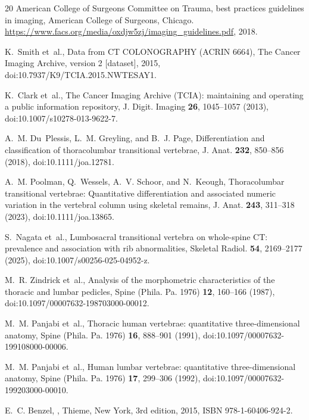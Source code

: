 \documentclass[aapm,mph,amsmath,amssymb,reprint]{revtex4-2}
\begin{document}
\begin{thebibliography}{20}
{American College of Surgeons Committee on Trauma},
 best practices guidelines in imaging,
\newblock American College of Surgeons, Chicago. \url{https://www.facs.org/media/oxdjw5zj/imaging_guidelines.pdf}, 2018.

K.~Smith et~al.,
\newblock Data from {CT COLONOGRAPHY} ({ACRIN} 6664),
\newblock The Cancer Imaging Archive, version 2 [dataset], 2015,
\newblock doi:10.7937/K9/TCIA.2015.NWTESAY1.

K.~Clark et~al.,
\newblock The {Cancer Imaging Archive} ({TCIA}): maintaining and operating a public information repository,
\newblock J. Digit. Imaging {\bf 26}, 1045--1057 (2013),
\newblock doi:10.1007/s10278-013-9622-7.

A.~M. Du~Plessis, L.~M. Greyling, and B.~J. Page,
\newblock Differentiation and classification of thoracolumbar transitional vertebrae,
\newblock J. Anat. {\bf 232}, 850--856 (2018),
\newblock doi:10.1111/joa.12781.

A.~M. Poolman, Q.~Wessels, A.~V. Schoor, and N.~Keough,
\newblock Thoracolumbar transitional vertebrae: Quantitative differentiation and associated numeric variation in the vertebral column using skeletal remains,
\newblock J. Anat. {\bf 243}, 311--318 (2023),
\newblock doi:10.1111/joa.13865.

S.~Nagata et~al.,
\newblock Lumbosacral transitional vertebra on whole-spine {CT}: prevalence and association with rib abnormalities,
\newblock Skeletal Radiol. {\bf 54}, 2169--2177 (2025),
\newblock doi:10.1007/s00256-025-04952-z.

M.~R. Zindrick et~al.,
\newblock Analysis of the morphometric characteristics of the thoracic and lumbar pedicles,
\newblock Spine (Phila. Pa. 1976) {\bf 12}, 160--166 (1987),
\newblock doi:10.1097/00007632-198703000-00012.

M.~M. Panjabi et~al.,
\newblock Thoracic human vertebrae: quantitative three-dimensional anatomy,
\newblock Spine (Phila. Pa. 1976) {\bf 16}, 888--901 (1991),
\newblock doi:10.1097/00007632-199108000-00006.

M.~M. Panjabi et~al.,
\newblock Human lumbar vertebrae: quantitative three-dimensional anatomy,
\newblock Spine (Phila. Pa. 1976) {\bf 17}, 299--306 (1992),
\newblock doi:10.1097/00007632-199203000-00010.

E.~C. Benzel,
,
\newblock Thieme, New York, 3rd edition, 2015,
\newblock ISBN 978-1-60406-924-2.


\end{thebibliography}
\end{document}
